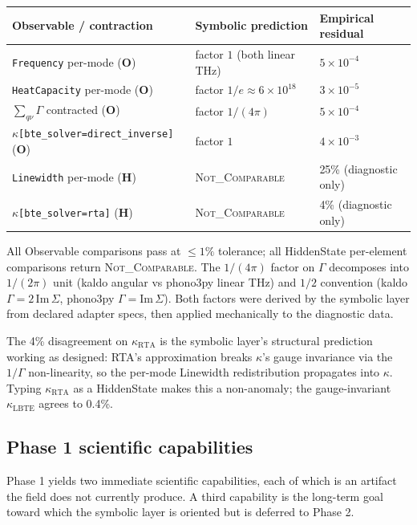 \documentclass[11pt,a4paper]{article}
\begin{document}
\begin{center}
\begin{tabular}{lll}
\toprule
Observable / contraction & Symbolic prediction & Empirical residual \\
\midrule
\texttt{Frequency} per-mode (\textbf{O})            & factor $1$ (both linear THz)  & $5\times 10^{-4}$ \\
\texttt{HeatCapacity} per-mode (\textbf{O})         & factor $1/e \approx 6\times 10^{18}$ & $3\times 10^{-5}$ \\
$\sum_{q\nu}\Gamma$ contracted (\textbf{O})          & factor $1/(4\pi)$              & $5\times 10^{-4}$ \\
$\kappa$\texttt{[bte\_solver=direct\_inverse]} (\textbf{O}) & factor $1$                & $4\times 10^{-3}$ \\
\midrule
\texttt{Linewidth} per-mode (\textbf{H})            & \textsc{Not\_Comparable} & 25\% (diagnostic only) \\
$\kappa$\texttt{[bte\_solver=rta]} (\textbf{H})     & \textsc{Not\_Comparable} & 4\% (diagnostic only) \\
\bottomrule
\end{tabular}
\end{center}

All Observable comparisons pass at $\le 1\%$ tolerance; all HiddenState per-element
comparisons return \textsc{Not\_Comparable}. The $1/(4\pi)$ factor on $\Gamma$
decomposes into $1/(2\pi)$ unit (kaldo angular vs phono3py linear THz) and $1/2$
convention (kaldo $\Gamma = 2\,\text{Im}\,\Sigma$, phono3py $\Gamma = \text{Im}\,\Sigma$).
Both factors were derived by the symbolic layer from declared adapter specs, then
applied mechanically to the diagnostic data.

The 4\% disagreement on $\kappa_\text{RTA}$ is the symbolic layer's structural prediction
working as designed: RTA's approximation breaks $\kappa$'s gauge invariance via the
$1/\Gamma$ non-linearity, so the per-mode Linewidth redistribution propagates into
$\kappa$. Typing $\kappa_\text{RTA}$ as a HiddenState makes this a non-anomaly; the
gauge-invariant $\kappa_\text{LBTE}$ agrees to 0.4\%.

\subsection{Phase 1 scientific capabilities}

Phase 1 yields two immediate scientific capabilities, each of which is an artifact the field does
not currently produce. A third capability is the long-term goal toward which the symbolic layer is
oriented but is deferred to Phase 2.
\end{document}
